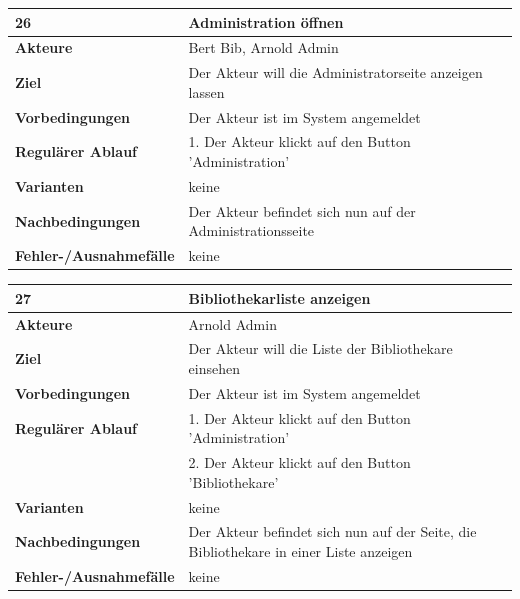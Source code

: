 \documentclass[fontsize=12pt,paper=a4,twoside]{scrartcl}
\begin{document}
\begin{table}[htbp]
\label{26}
\begin{tabular}{|l|p{10cm}|}
\hline 
\textbf{26} & \textbf{Administration öffnen} \\ \hline
\textbf{Akteure} & Bert Bib, Arnold Admin\\ \hline
\textbf{Ziel} & Der Akteur will die Administratorseite anzeigen lassen \\ \hline
\textbf{Vorbedingungen} & Der Akteur ist im System angemeldet \\ \hline
\textbf{Regulärer Ablauf} & 
1. Der Akteur klickt auf den Button 'Administration' \\
\hline
\textbf{Varianten} & 
keine \\ \hline
\textbf{Nachbedingungen} & Der Akteur befindet sich nun auf der Administrationsseite\\ \hline
\textbf{Fehler-/Ausnahmefälle} & keine\\
\hline
\end{tabular}
\end{table}

\newpage

\begin{table}[htbp]
\label{27}
\begin{tabular}{|l|p{10cm}|}
\hline 
\textbf{27} & \textbf{Bibliothekarliste anzeigen} \\ \hline
\textbf{Akteure} & Arnold Admin\\ \hline
\textbf{Ziel} & Der Akteur will die Liste der Bibliothekare einsehen \\ \hline
\textbf{Vorbedingungen} & Der Akteur ist im System angemeldet \\ \hline
\textbf{Regulärer Ablauf} & 
1. Der Akteur klickt auf den Button 'Administration' \\
&2. Der Akteur klickt auf den Button 'Bibliothekare'\\
\hline
\textbf{Varianten} & 
keine \\ \hline
\textbf{Nachbedingungen} & Der Akteur befindet sich nun auf der Seite, die Bibliothekare in einer 
Liste anzeigen\\ \hline
\textbf{Fehler-/Ausnahmefälle} & keine\\
\hline
\end{tabular}
\end{table}
\end{document}
